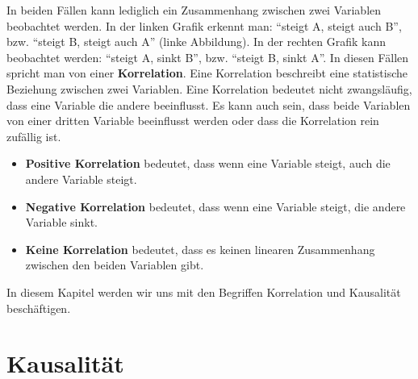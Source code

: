 In beiden Fällen kann lediglich ein Zusammenhang zwischen zwei Variablen beobachtet werden. In der linken Grafik erkennt man: \enquote{steigt A, steigt auch B}, bzw. \enquote{steigt B, steigt auch A} (linke Abbildung). In der rechten Grafik kann beobachtet werden: \enquote{steigt A, sinkt B}, bzw. \enquote{steigt B, sinkt A}. In diesen Fällen spricht man von einer \textbf{Korrelation}. Eine Korrelation beschreibt eine statistische Beziehung zwischen zwei Variablen. Eine Korrelation bedeutet nicht zwangsläufig, dass eine Variable die andere beeinflusst. Es kann auch sein, dass beide Variablen von einer dritten Variable beeinflusst werden oder dass die Korrelation rein zufällig ist.
\begin{itemize}
	\item \textbf{Positive Korrelation} bedeutet, dass wenn eine Variable steigt, auch die andere Variable steigt.
	\item \textbf{Negative Korrelation} bedeutet, dass wenn eine Variable steigt, die andere Variable sinkt.
	\item \textbf{Keine Korrelation} bedeutet, dass es keinen linearen Zusammenhang zwischen den beiden Variablen gibt.
\end{itemize}

In diesem Kapitel werden wir uns mit den Begriffen Korrelation und Kausalität beschäftigen.

\section{Kausalität}

